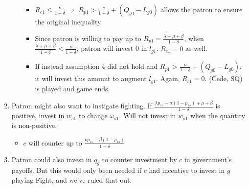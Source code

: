 \documentclass[12pt]{article}
\newcommand{\de}{\delta}
\begin{document}
\begin{enumerate}
\begin{itemize}
\begin{itemize}
					\item $R_{c1} \leq \frac{\nu}{1-\de} \Rightarrow$ $R_{p1} > \frac{\nu}{1-\de} + \left( Q_{g0} - L_{g0}\right)$ allows the patron to ensure the original inequality
					\item Since patron is willing to pay up to $R_{p1} = \frac{\lambda +\mu + \beta}{1-\de}$, when $\frac{\lambda +\mu + \beta}{1-\de} \leq \frac{\nu}{1-\de}$, patron will invest 0 in $l_{g1}$. $R_{c1} = 0$ as well.
					\item If instead assumption 4 did not hold and $R_{p1} > \frac{\nu}{1-\de} + \left( Q_{g0} - L_{g0}\right)$, it will invest this amount to augment $l_{g1}$. Again, $R_{c1} = 0$. (Cede, SQ) is played and game ends.
				\end{itemize}
		\end{itemize}
	\item Patron might also want to instigate fighting. If $\frac{\lambda p_{1s} - \alpha (1-p_{1s}) + \mu + \beta}{1 - \de}$ is positive, invest in $w_{s1}$ to change $\omega_{s1}$. Will not invest in $w_{s1}$ when the quantity is non-positive.
		\begin{itemize}
			\item $c$ will counter up to $\frac{\nu p_{1s} - \beta (1-p_{1s})}{1 -\de}$
		\end{itemize}
	\item Patron could also invest in $q_g$ to counter investment by $c$ in government's payoffs. But this would only been needed if $c$ had incentive to invest in $g$ playing Fight, and we've ruled that out.
\end{enumerate}
\end{document}

